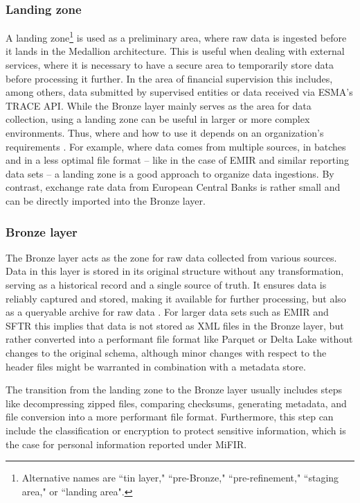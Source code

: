 \documentclass[a4paper, 11pt]{report}
\begin{document}
\subsubsection{Landing zone}

A landing zone\footnote{Alternative names are ``tin layer," ``pre-Bronze," ``pre-refinement," ``staging area," or  ``landing area".} is used as a preliminary area, where raw data is ingested before it lands in the Medallion architecture. This is useful when dealing with external services, where it is necessary to have a secure area to temporarily store data before processing it further. In the area of financial supervision this includes, among others, data submitted by supervised entities or data received via ESMA's TRACE API. While the Bronze layer mainly serves as the area for data collection, using a landing zone can be useful in larger or more complex environments. Thus, where and how to use it depends on an organization's requirements \parencite{Strengholt.2025}. For example, where data comes from multiple sources, in batches and in a less optimal file format -- like in the case of EMIR and similar reporting data sets -- a landing zone is a good approach to organize data ingestions. By contrast, exchange rate data from European Central Banks is rather small and can be directly imported into the Bronze layer.


\subsubsection{Bronze layer}

The Bronze layer acts as the zone for raw data collected from various sources. Data in this layer is stored in its original structure without any transformation, serving as a historical record and a single source of truth. It ensures data is reliably captured and stored, making it available for further processing, but also as a queryable archive for raw data \parencite{Strengholt.2025}. For larger data sets such as EMIR and SFTR this implies that data is not stored as XML files in the Bronze layer, but rather converted into a performant file format like Parquet or Delta Lake without changes to the original schema, although minor changes with respect to the header files might be warranted in combination with a metadata store.

The transition from the landing zone to the Bronze layer usually includes steps like decompressing zipped files, comparing checksums, generating metadata, and file conversion into a more performant file format. Furthermore, this step can include the classification or encryption to protect sensitive information, which is the case for personal information reported under MiFIR.
\end{document}
